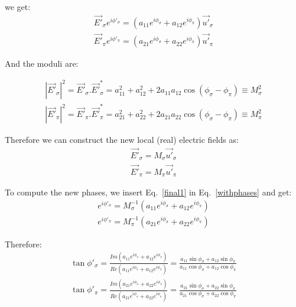 \documentclass[a4paper,10pt]{article}
\begin{document}
we get:
\begin{eqnarray}
\label{withphases}
\vec{E'}_\sigma e^{i \phi'_\sigma} = (a_{11} e^{i \phi_\sigma} + a_{12} e^{i \phi_\pi}) \vec{u'}_\sigma \nonumber \\ 
\vec{E'}_\pi e^{i \phi'_\pi} =    (a_{21} e^{i \phi_\sigma} + a_{22} e^{i \phi_\pi}) \vec{u'}_\pi
\end{eqnarray}

And the moduli are: 

\begin{eqnarray}
|\vec{E'}_\sigma|^2 = \vec{E'}_\sigma . \vec{E'}_\sigma^*  = 
a_{11}^2 + a_{12}^2 + 2 a_{11} a_{12} \cos(\phi_\sigma-\phi_\pi) \equiv
M_\sigma^2 \nonumber \\ 
|\vec{E'}_\pi|^2    = \vec{E'}_\pi    . \vec{E'}_\pi^*     = 
a_{21}^2 + a_{22}^2 + 2 a_{21} a_{22} \cos(\phi_\sigma-\phi_\pi) \equiv
M_\pi^2
\end{eqnarray}

Therefore we can construct the new local (real) electric fields as: 
\begin{eqnarray}
\label{final1}
\vec{E'}_\sigma = M_\sigma \vec{u'}_\sigma  \nonumber \\ 
\vec{E'}_\pi = M_\pi \vec{u'}_\pi  
\end{eqnarray}

To compute the new phases, we insert Eq.~\ref{final1} in Eq.~\ref{withphases} and get: 
\begin{eqnarray}
e^{i \phi'_\sigma} = M_\sigma^{-1} (a_{11} e^{i \phi_\sigma} + a_{12} e^{i \phi_\pi})  \nonumber \\ 
e^{i \phi'_\pi} =  M_\pi^{-1}      (a_{21} e^{i \phi_\sigma} + a_{22} e^{i \phi_\pi}) 
\end{eqnarray}

Therefore:
\begin{eqnarray}
\label{final2}
\tan{\phi'_\sigma} = \frac{Im(a_{11} e^{i \phi_\sigma} + a_{12} e^{i \phi_\pi})}
                          {Re(a_{11} e^{i \phi_\sigma} + a_{12} e^{i \phi_\pi})} = 
                          \frac{a_{11} \sin{\phi_\sigma} + a_{12} \sin{\phi_\pi}}
                               {a_{11} \cos{\phi_\sigma} + a_{12} \cos{\phi_\pi}}  \nonumber \\ 
\tan{\phi'_\pi} =  \frac{Im(a_{21} e^{i \phi_\sigma} + a_{22} e^{i \phi_\pi})}
                        {Re(a_{21} e^{i \phi_\sigma} + a_{22} e^{i \phi_\pi})} = 
                        \frac{a_{21} \sin{\phi_\sigma} + a_{22} \sin{\phi_\pi}}
                             {a_{21} \cos{\phi_\sigma} + a_{22} \cos{\phi_\pi}}
\end{eqnarray}
\end{document}
